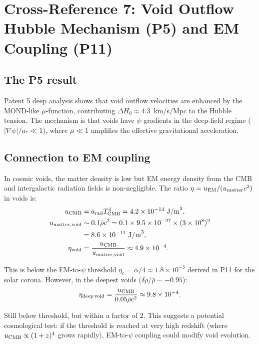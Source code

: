 \documentclass[11pt,twocolumn]{article}
\newcommand{\astar}{a_*}
\begin{document}
\section{Cross-Reference 7: Void Outflow Hubble Mechanism (P5)
and EM Coupling (P11)}
\label{sec:void}

\subsection{The P5 result}

Patent 5 deep analysis shows that void outflow velocities are enhanced
by the MOND-like $\mu$-function, contributing
$\Delta H_0 \approx 4.3$~km/s/Mpc to the Hubble tension. The mechanism
is that voids have $\psi$-gradients in the deep-field regime
($|\nabla\psi|/\astar \ll 1$), where $\mu \ll 1$ amplifies the
effective gravitational acceleration.

\subsection{Connection to EM coupling}

In cosmic voids, the matter density is low but EM energy density from
the CMB and intergalactic radiation fields is non-negligible. The
ratio $\eta = u_{\rm EM}/(u_{\rm matter}c^2)$ in voids is:
\begin{align}
u_{\rm CMB} &= a_{\rm rad}T_{\rm CMB}^4 = 4.2\times10^{-14}~\text{J/m}^3,
\\
u_{\rm matter,void} &\sim 0.1\bar{\rho}c^2
= 0.1 \times 9.5\times10^{-27} \times (3\times10^8)^2
\nonumber\\
&= 8.6\times10^{-11}~\text{J/m}^3,
\\
\eta_{\rm void} &= \frac{u_{\rm CMB}}{u_{\rm matter,void}}
\approx 4.9\times10^{-4}.
\end{align}

This is below the EM-to-$\psi$ threshold $\eta_c = \alpha/4 \approx
1.8\times10^{-3}$ derived in P11 for the solar corona. However, in
the deepest voids ($\delta \rho/\bar{\rho} \sim -0.95$):
\begin{equation}
\eta_{\rm deep\,void} = \frac{u_{\rm CMB}}{0.05\bar{\rho}c^2}
\approx 9.8\times10^{-4}.
\end{equation}

Still below threshold, but within a factor of 2. This suggests a
potential cosmological test: if the threshold is reached at very
high redshift (where $u_{\rm CMB} \propto (1+z)^4$ grows rapidly),
EM-to-$\psi$ coupling could modify void evolution.
\end{document}

